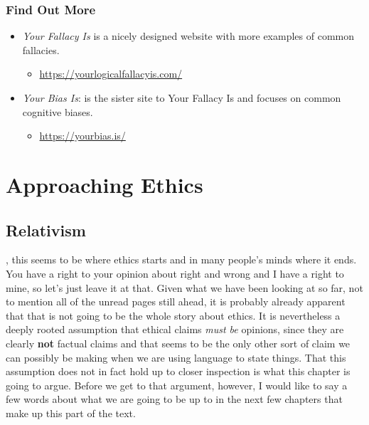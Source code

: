\documentclass[justified]{tufte-book}
\providecommand{\tightlist}{%
  \setlength{\itemsep}{0pt}\setlength{\parskip}{0pt}}
\begin{document}
\hypertarget{find-out-more}{%
\section*{Find Out More}\label{find-out-more}}

\begin{itemize}
\tightlist
\item
  \emph{Your Fallacy Is} is a nicely designed website with more examples of common fallacies.

  \begin{itemize}
  \tightlist
  \item
    \url{https://yourlogicalfallacyis.com/}
  \end{itemize}
\item
  \emph{Your Bias Is}: is the sister site to Your Fallacy Is and focuses on common cognitive biases.

  \begin{itemize}
  \tightlist
  \item
    \url{https://yourbias.is/}
  \end{itemize}
\end{itemize}

\hypertarget{part-approaching-ethics}{%
\part*{Approaching Ethics}\label{part-approaching-ethics}}

\hypertarget{relativism}{%
\chapter{Relativism}\label{relativism}}

, this seems to be where ethics starts and in many people's minds where it ends. You have a right to your opinion about right and wrong and I have a right to mine, so let's just leave it at that. Given what we have been looking at so far, not to mention all of the unread pages still ahead, it is probably already apparent that that is not going to be the whole story about ethics. It is nevertheless a deeply rooted assumption that ethical claims \emph{must be} opinions, since they are clearly \textbf{not} factual claims and that seems to be the only other sort of claim we can possibly be making when we are using language to state things. That this assumption does not in fact hold up to closer inspection is what this chapter is going to argue. Before we get to that argument, however, I would like to say a few words about what we are going to be up to in the next few chapters that make up this part of the text.
\end{document}
